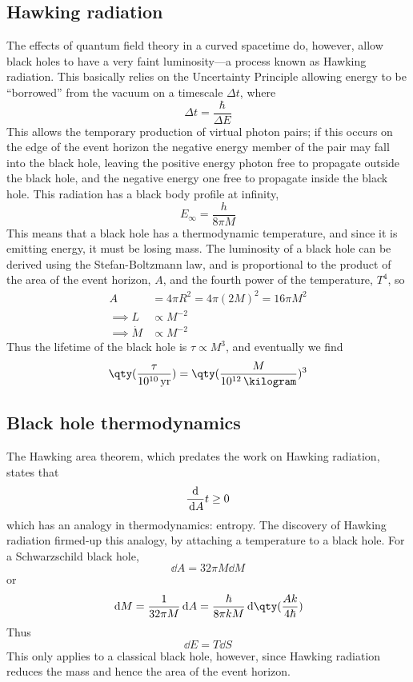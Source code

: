 \subsection{Hawking radiation}
\label{sec:hawking-radiation}

The effects of quantum field theory in a curved spacetime do, however,
allow black holes to have a very faint luminosity---a process known as
Hawking radiation. This basically relies on the Uncertainty Principle
allowing energy to be ``borrowed'' from the vacuum on a timescale
$\Delta t$, where
\[ \Delta t = \frac{\hbar}{\Delta E} \] This allows the temporary
production of virtual photon pairs; if this occurs on the edge of the
event horizon the negative energy member of the pair may fall into the
black hole, leaving the positive energy photon free to propagate
outside the black hole, and the negative energy one free to propagate
inside the black hole. This radiation has a black body profile at
infinity,
\[ E_{\infty} = \frac{h}{8 \pi M} \] This means that a black hole has
a thermodynamic temperature, and since it is emitting energy, it must
be losing mass. The luminosity of a black hole can be derived using
the Stefan-Boltzmann law, and is proportional to the product of the
area of the event horizon, $A$, and the fourth power of the
temperature, $T^4$, so
\begin{align}
  A &= 4 \pi R^2 = 4 \pi (2M)^2 = 16 \pi M^2 \nonumber\\
\implies L & \propto M^{-2} \nonumber\\
\implies \dot{M} & \propto M^{-2} \nonumber
\end{align}
Thus the lifetime of the black hole is $\tau \propto M^3$, and eventually we find
\begin{equation}
  \label{eq:240}
  \qty( \frac{\tau}{10^{10}\,\text{yr}} ) = \qty( \frac{M}{10^{12}\,\kilogram} )^3
\end{equation}

\subsection{Black hole thermodynamics}
\label{sec:black-hole-therm}

The Hawking area theorem, which predates the work on Hawking
radiation, states that
\[ \frac{\mathrm{d}}{\,\mathrm{d} A}{t} \ge 0 \] which has an analogy in thermodynamics:
entropy. The discovery of Hawking radiation firmed-up this analogy, by
attaching a temperature to a black hole. For a Schwarzschild black
hole,
\[ \dd{A} = 32 \pi M \dd{M} \]
or
\[ \dd{M} = \frac{1}{32 \pi M} \dd{A} = \frac{\hbar}{8 \pi k M} \dd{\qty(\frac{Ak}{4 \hbar})} \]
Thus
\[ \dd{E} = T \dd{S} \] This only applies to a classical black hole,
however, since Hawking radiation reduces the mass and hence the area
of the event horizon.



